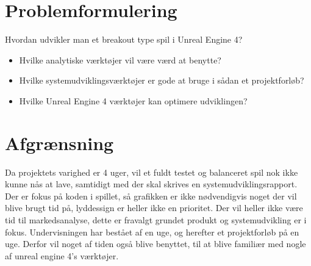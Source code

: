 \section{Problemformulering}
Hvordan udvikler man et breakout type spil i Unreal Engine 4?
\begin{itemize}
	\item Hvilke analytiske værktøjer vil være værd at benytte?
	\item Hvilke systemudviklingsværktøjer er gode at bruge i sådan et projektforløb?
	\item Hvilke Unreal Engine 4 værktøjer kan optimere udviklingen?
\end{itemize}
\section{Afgrænsning}
Da projektets varighed er 4 uger, vil et fuldt testet og balanceret spil nok ikke kunne nås at lave, samtidigt med der skal skrives en systemudviklingsrapport. Der er fokus på koden i spillet, så grafikken er ikke nødvendigvis noget der vil blive brugt tid på, lyddessign er heller ikke en prioritet. Der vil heller ikke være tid til markedsanalyse, dette er fravalgt grundet produkt og systemudvikling er i fokus. Undervisningen har bestået af en uge, og herefter et projektforløb på en uge. Derfor vil noget af tiden også blive benyttet, til at blive familiær med nogle af unreal engine 4’s værktøjer.
